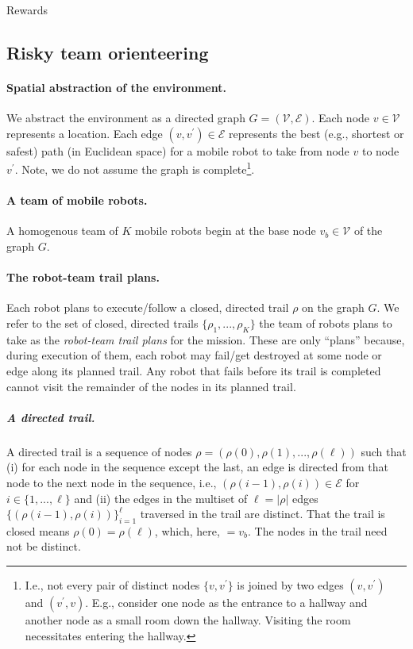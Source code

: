 \documentclass[11pt, oneside]{article}
\begin{document}
Rewards 

\subsection{Risky team orienteering}

\paragraph{Spatial abstraction of the environment.}
We abstract the environment as a directed graph $G=(\mathcal{V}, \mathcal{E})$. Each node $v\in \mathcal{V}$ represents a location. Each edge $(v, v^\prime) \in \mathcal{E}$ represents the best (e.g., shortest or safest) path (in Euclidean space) for a mobile robot to take from node $v$ to node $v^\prime$.
Note, we do not assume the graph is complete\footnote{I.e., not every pair of distinct nodes $\{v, v^\prime\}$ is joined by two edges $(v, v^\prime)$ and $(v^\prime, v)$. E.g., consider one node as the entrance to a hallway and another node as a small room down the hallway. Visiting the room necessitates entering the hallway.}.

\paragraph{A team of mobile robots.} 
A homogenous team of $K$ mobile robots begin at the base node $v_b \in \mathcal{V}$ of the graph $G$. 

\paragraph{The robot-team trail plans.}
Each robot plans to execute/follow a closed, directed trail $\rho$ on the graph $G$.  
We refer to the set of closed, directed trails $\{\rho_1, ..., \rho_K\}$ the team of robots plans to take as the \emph{robot-team trail plans} for the mission.
These are only ``plans'' because, during execution of them, each robot may fail/get destroyed at some node or edge along its planned trail. Any robot that fails before its trail is completed cannot visit the remainder of the nodes in its planned trail.

\subparagraph{A directed trail.} A directed trail is a sequence of nodes $\rho=(\rho(0), \rho(1), ..., \rho(\ell))$ such that 
(i) for each node in the sequence except the last, an edge is directed from that node to the next node in the sequence, i.e., $(\rho(i-1), \rho(i))\in\mathcal{E}$ for $i \in \{1, ..., \ell\}$
and 
(ii) the edges in the multiset of $\ell =\lvert \rho \rvert$ edges $\{(\rho(i-1), \rho(i))\}_{i=1}^{\ell}$ traversed in the trail are distinct.
That the trail is closed means $\rho(0)=\rho(\ell)$, which, here, $=v_b$.
The nodes in the trail need not be distinct.
\end{document}
